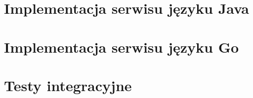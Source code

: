 \appendix
\chapter{Implementacja serwisu języku Java}
\chapter{Implementacja serwisu języku Go}
\chapter{Testy integracyjne}